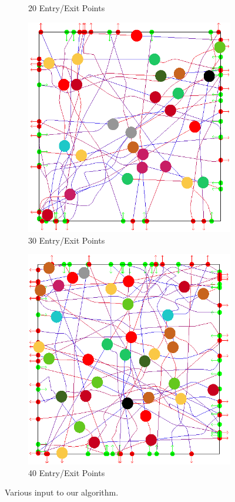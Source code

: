 \begin{figure}[t]
\begin{subfigure}[b]{0.24\linewidth}
	\caption{20 Entry/Exit Points}
 \end{subfigure}
%
 \begin{subfigure}[b]{0.24\linewidth}
	\includegraphics[width=\linewidth]{images/res-30-entry-exit.png}
	\caption{30 Entry/Exit Points}
 \end{subfigure}
%
 \begin{subfigure}[b]{0.24\linewidth}
	\includegraphics[width=\linewidth]{images/res-40-entry-exit.png}
	\caption{40 Entry/Exit Points}
 \end{subfigure}
%
\caption{Various input to our algorithm.}
\label{fig:res:inputs}
\end{figure}

